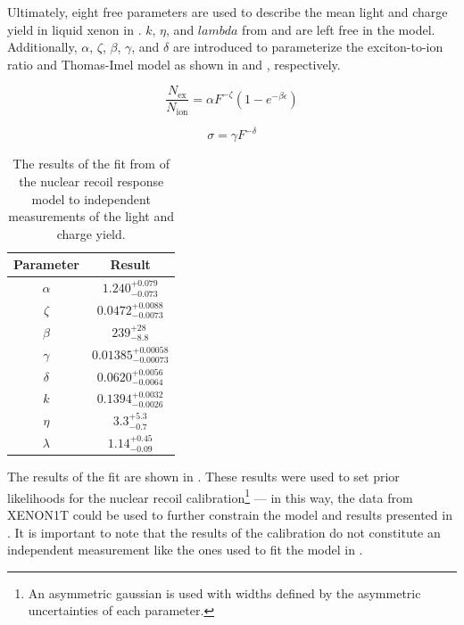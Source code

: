 Ultimately, eight free parameters are used to describe the mean light and charge yield in liquid xenon in .  $k$, $\eta$, and $lambda$ from  and  are left free in the model.  Additionally, $\alpha$, $\zeta$, $\beta$, $\gamma$, and $\delta$ are introduced to parameterize the exciton-to-ion ratio and Thomas-Imel model as shown in  and , respectively.


\begin{equation}
        \label{eqn:xe1t_ex_ion_parameterization}
        \frac{N_{\textrm{ex}}}{N_{\textrm{ion}}} = \alpha F^{-\zeta} (1 - e^{-\beta \epsilon})
\end{equation}

\begin{equation}
        \label{eqn:ti_model_parameterization}
        \sigma = \gamma F^{-\delta}
\end{equation}

\begin{table}[t]
\centering
\def\arraystretch{1.3}
\begin{tabular}{|c|c|}
\hline
Parameter & Result \\
\hline
$\alpha$ & $1.240^{+0.079}_{-0.073}$ \\ \hline
$\zeta$ & $0.0472^{+0.0088}_{-0.0073}$ \\ \hline
$\beta$ & $239^{+28}_{-8.8}$ \\ \hline
$\gamma$ & $0.01385^{+0.00058}_{-0.00073}$ \\ \hline
$\delta$ & $0.0620^{+0.0056}_{-0.0064}$ \\ \hline
$k$ & $0.1394^{+0.0032}_{-0.0026}$ \\ \hline
$\eta$ & $3.3^{+5.3}_{-0.7}$ \\ \hline
$\lambda$ & $1.14^{+0.45}_{-0.09}$ \\ \hline
\end{tabular}
\caption{The results of the fit from  of the nuclear recoil response model to independent measurements of the light and charge yield.}
\label{tab:xe1t_nest_results}
\end{table}

The results of the fit are shown in .  These results were used to set prior likelihoods for the nuclear recoil calibration\footnote{An asymmetric gaussian is used with widths defined by the asymmetric uncertainties of each parameter.} --- in this way, the data from XENON1T could be used to further constrain the model and results presented in .  It is important to note that the results of the calibration do not constitute an independent measurement like the ones used to fit the model in . 


